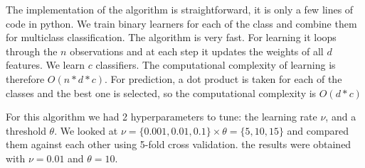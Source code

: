\documentclass[10pt,a4paper]{article}
\begin{document}
The implementation of the algorithm is straightforward, it is only a few lines of code in python. We train binary learners for each of the class and combine them for multiclass classification. The algorithm is very fast. For learning it loops through the $n$ observations and at each step it updates the weights of all $d$ features. We learn $c$ classifiers. The computational complexity of learning is therefore $O(n*d*c)$. For prediction, a dot product is taken for each of the classes and the best one is selected, so the computational complexity is $O(d*c)$

For this algorithm we had 2 hyperparameters to tune: the learning rate $\nu$, and a threshold $\theta$. We looked at $\nu = \{0.001,0.01,0.1\} \times \theta = \{5,10,15\}$ and compared them against each other using 5-fold cross validation. the results were obtained with $\nu = 0.01$ and $\theta = 10$.
\end{document}
